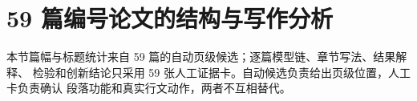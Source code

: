 \section{59 篇编号论文的结构与写作分析}

本节篇幅与标题统计来自 59 篇的自动页级候选；逐篇模型链、章节写法、结果解释、
检验和创新结论只采用 59 张人工证据卡。自动候选负责给出页级位置，人工卡负责确认
段落功能和真实行文动作，两者不互相替代。

